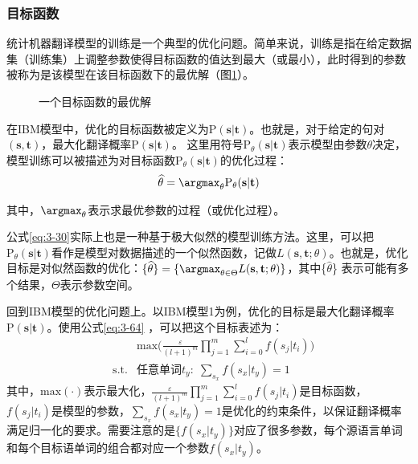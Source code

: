 \subsubsection{目标函数}

\parinterval 统计机器翻译模型的训练是一个典型的优化问题。简单来说，训练是指在给定数据集（训练集）上调整参数使得目标函数的值达到最大（或最小），此时得到的参数被称为是该模型在该目标函数下的最优解（图\ref{fig:3-22}）。

\begin{figure}[htp]
    \centering

   \caption{一个目标函数的最优解}
   \label{fig:3-22}
\end{figure}

\parinterval 在IBM模型中，优化的目标函数被定义为$\textrm{P}(\mathbf{s}| \mathbf{t})$。也就是，对于给定的句对$(\mathbf{s},\mathbf{t})$，最大化翻译概率$\textrm{P}(\mathbf{s}| \mathbf{t})$。 这里用符号$\textrm{P}_{\theta}(\mathbf{s}|\mathbf{t})$表示模型由参数$\theta$决定，模型训练可以被描述为对目标函数$\textrm{P}_{\theta}(\mathbf{s}|\mathbf{t})$的优化过程：
\begin{eqnarray}
\widehat{\theta}=\argmax_{\theta}\textrm{P}_{\theta}(\mathbf{s}|\mathbf{t})
\label{eq:3-30}
\end{eqnarray}

\noindent 其中，$\argmax_{\theta}$表示求最优参数的过程（或优化过程）。

\parinterval 公式\ref{eq:3-30}实际上也是一种基于极大似然的模型训练方法。这里，可以把$\textrm{P}_{\theta}(\mathbf{s}|\mathbf{t})$看作是模型对数据描述的一个似然函数，记做$L(\mathbf{s},\mathbf{t};\theta)$。也就是，优化目标是对似然函数的优化：$\{\widehat{\theta}\}=\{\argmax_{\theta \in \Theta}L(\mathbf{s},\mathbf{t};\theta)\}$，其中\{$\widehat{\theta}$\} 表示可能有多个结果，$\Theta$表示参数空间。

\parinterval 回到IBM模型的优化问题上。以IBM模型1为例，优化的目标是最大化翻译概率$\textrm{P}(\mathbf{s}| \mathbf{t})$。使用公式\ref{eq:3-64} ，可以把这个目标表述为：
\begin{eqnarray}
&                    & \textrm{max}\Big(\frac{\varepsilon}{(l+1)^m}\prod_{j=1}^{m}\sum_{i=0}^{l}{f({s_j|t_i})}\Big) \nonumber \\
& \textrm{s.t.} & \textrm{任意单词} t_{y}:\;\sum_{s_x}{f(s_x|t_y)}=1 \nonumber
\label{eq:3-31}
\end{eqnarray}
\noindent 其中，$\textrm{max}(\cdot)$表示最大化，$\frac{\varepsilon}{(l+1)^m}\prod_{j=1}^{m}\sum_{i=0}^{l}{f({s_j|t_i})}$是目标函数，$f({s_j|t_i})$是模型的参数，$\sum_{s_x}{f(s_x|t_y)}=1$是优化的约束条件，以保证翻译概率满足归一化的要求。需要注意的是$\{f(s_x |t_y)\}$对应了很多参数，每个源语言单词和每个目标语单词的组合都对应一个参数$f(s_x |t_y)$。

